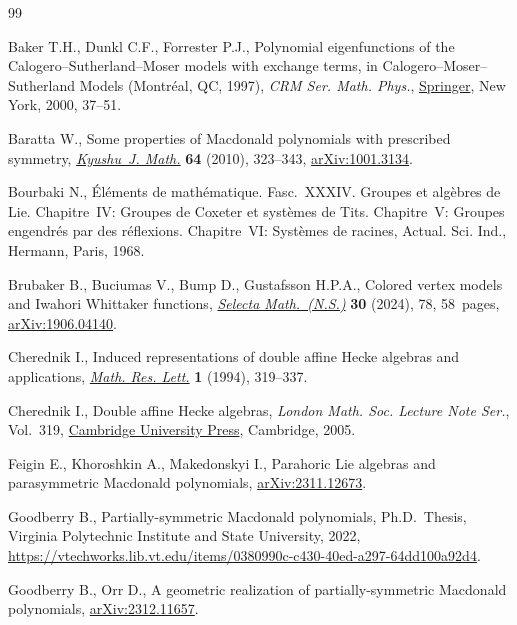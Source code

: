 \begin{thebibliography}{99}
\footnotesize\itemsep=0pt

Baker T.H., Dunkl C.F., Forrester P.J., Polynomial eigenfunctions of the
 {C}alogero--{S}utherland--{M}oser models with exchange terms, in
 Calogero--{M}oser--{S}utherland {M}odels ({M}ontr\'eal, {QC}, 1997), \textit{CRM Ser.
 Math. Phys.}, \href{https://doi.org/10.1007/978-1-4612-1206-5_3}{Springer}, New
 York, 2000, 37--51.

Baratta W., Some properties of {M}acdonald polynomials with prescribed
 symmetry, \href{https://doi.org/10.2206/kyushujm.64.323}{\textit{Kyushu~J.
 Math.}} \textbf{64} (2010), 323--343,
 \href{http://arxiv.org/abs/1001.3134}{arXiv:1001.3134}.

Bourbaki N., \'{E}l\'ements de math\'ematique. {F}asc.~{XXXIV}. {G}roupes et
 alg\`ebres de {L}ie. {C}hapitre~{IV}: {G}roupes de {C}oxeter et syst\`emes de
 {T}its. {C}hapitre~{V}: {G}roupes engendr\'es par des r\'eflexions.
 {C}hapitre~{VI}: {S}yst\`emes de racines, Actual. Sci. Ind., Hermann, Paris,
 1968.

Brubaker B., Buciumas V., Bump D., Gustafsson H.P.A., Colored vertex models and
 {I}wahori {W}hittaker functions,
 \href{https://doi.org/10.1007/s00029-024-00950-6}{\textit{Selecta
 Math.~(N.S.)}} \textbf{30} (2024), 78, 58~pages,
 \href{http://arxiv.org/abs/1906.04140}{arXiv:1906.04140}.

Cherednik I., Induced representations of double affine {H}ecke algebras and
 applications, \href{https://doi.org/10.4310/MRL.1994.v1.n3.a4}{\textit{Math.
 Res. Lett.}} \textbf{1} (1994), 319--337.

Cherednik I., Double affine {H}ecke algebras, \textit{London Math. Soc. Lecture
 Note Ser.}, Vol.~319,
 \href{https://doi.org/10.1017/CBO9780511546501}{Cambridge University Press},
 Cambridge, 2005.

Feigin E., Khoroshkin A., Makedonskyi I., Parahoric {L}ie algebras and
 parasymmetric {M}acdonald polynomials,
 \href{http://arxiv.org/abs/2311.12673}{arXiv:2311.12673}.

Goodberry B., Partially-symmetric {M}acdonald polynomials, Ph.D.~Thesis,
 {V}irginia Polytechnic Institute and State University, 2022,
 \url{https://vtechworks.lib.vt.edu/items/0380990c-c430-40ed-a297-64dd100a92d4}.

Goodberry B., Orr D., A geometric realization of partially-symmetric
 {M}acdonald polynomials,
 \href{http://arxiv.org/abs/2312.11657}{arXiv:2312.11657}.


\end{thebibliography}
